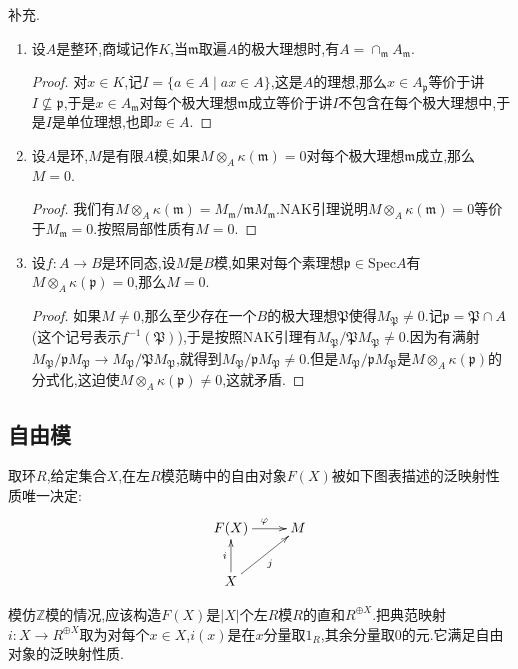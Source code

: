 补充.
\begin{enumerate}
	\item 设$A$是整环,商域记作$K$,当$\mathfrak{m}$取遍$A$的极大理想时,有$A=\cap_{\mathfrak{m}}A_{\mathfrak{m}}$.
	\begin{proof}
		
	    对$x\in K$,记$I=\{a\in A\mid ax\in A\}$,这是$A$的理想,那么$x\in A_{\mathfrak{p}}$等价于讲$I\not\subseteq\mathfrak{p}$,于是$x\in A_{\mathfrak{m}}$对每个极大理想$\mathfrak{m}$成立等价于讲$I$不包含在每个极大理想中,于是$I$是单位理想,也即$x\in A$.
	\end{proof}
    \item 设$A$是环,$M$是有限$A$模,如果$M\otimes_A\kappa(\mathfrak{m})=0$对每个极大理想$\mathfrak{m}$成立,那么$M=0$.
    \begin{proof}
    	
    	我们有$M\otimes_A\kappa(\mathfrak{m})=M_{\mathfrak{m}}/\mathfrak{m}M_{\mathfrak{m}}$.NAK引理说明$M\otimes_A\kappa(\mathfrak{m})=0$等价于$M_{\mathfrak{m}}=0$.按照局部性质有$M=0$.
    \end{proof}
    \item 设$f:A\to B$是环同态,设$M$是$B$模,如果对每个素理想$\mathfrak{p}\in\mathrm{Spec}A$有$M\otimes_A\kappa(\mathfrak{p})=0$,那么$M=0$.
    \begin{proof}
    	
    	如果$M\not=0$,那么至少存在一个$B$的极大理想$\mathfrak{P}$使得$M_{\mathfrak{P}}\not=0$.记$\mathfrak{p}=\mathfrak{P}\cap A$(这个记号表示$f^{-1}(\mathfrak{P})$),于是按照NAK引理有$M_{\mathfrak{P}}/\mathfrak{P}M_{\mathfrak{P}}\not=0$.因为有满射$M_{\mathfrak{P}}/\mathfrak{p}M_{\mathfrak{P}}\to M_{\mathfrak{P}}/\mathfrak{P}M_{\mathfrak{P}}$,就得到$M_{\mathfrak{P}}/\mathfrak{p}M_{\mathfrak{P}}\not=0$.但是$M_{\mathfrak{P}}/\mathfrak{p}M_{\mathfrak{P}}$是$M\otimes_A\kappa(\mathfrak{p})$的分式化,这迫使$M\otimes_A\kappa(\mathfrak{p})\not=0$,这就矛盾.
    \end{proof}
\end{enumerate}
\newpage
\subsection{自由模}

取环$R$,给定集合$X$,在左$R$模范畴中的自由对象$F(X)$被如下图表描述的泛映射性质唯一决定:
$$\xymatrix{
	F(X)\ar[r]^{\varphi}&M\\
	X\ar[u]^{i}\ar[ur]_{j}&
}$$

模仿$\mathbb{Z}$模的情况,应该构造$F(X)$是$|X|$个左$R$模$R$的直和$R^{\oplus X}$.把典范映射$i:X\to R^{\oplus X}$取为对每个$x\in X$,$i(x)$是在$x$分量取$1_R$,其余分量取0的元.它满足自由对象的泛映射性质.

